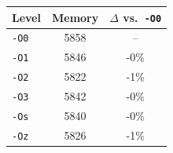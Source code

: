 \begin{tabular*}{\columnwidth}{@{\extracolsep\fill}lcc@{\extracolsep\fill}}
\toprule
\textbf{Level} & \textbf{Memory} & \textbf{$\Delta$ vs.\ \texttt{-O0}} \\
\midrule
\texttt{-O0} & 5858 & -- \\
\texttt{-O1} & 5846 & -0\% \\
\texttt{-O2} & 5822 & -1\% \\
\texttt{-O3} & 5842 & -0\% \\
\texttt{-Os} & 5840 & -0\% \\
\texttt{-Oz} & 5826 & -1\% \\
\bottomrule
\end{tabular*}
